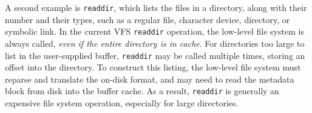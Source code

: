 A second example is {\tt readdir}, which lists the files in a directory,
along with 
their \inode{} number
and their types, such as a regular file, 
character device, directory, or symbolic link.
In the current VFS {\tt readdir} operation, 
the low-level file system is always called, {\em even if the entire directory
is in cache}.
For directories too large to list in the user-supplied buffer,
{\tt readdir} may be called multiple times, storing an offset into the directory.
To construct this listing,
the low-level file system must 
reparse and translate the on-disk format,
and may need to read the metadata block from disk into the buffer cache.
As a result,
{\tt readdir} is generally an expensive file system operation,
especially for large directories. %





